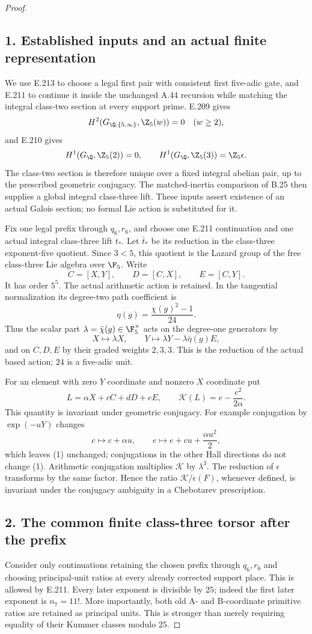 \begin{proof}
\subsection*{1. Established inputs and an actual finite representation}
We use E.213 to choose a legal first pair with consistent first five-adic gate, and E.211 to continue it inside the unchanged A.44 recursion while matching the integral class-two section at every support prime. E.209 gives
\[
 H^2(G_{\Q,\{5,\infty\}},\Z_5(w))=0\quad(w\ge2),
\]
and E.210 gives
\[
 H^1(G_\Q,\Z_5(2))=0,\qquad
 H^1(G_\Q,\Z_5(3))=\Z_5\epsilon.
\]
The class-two section is therefore unique over a fixed integral abelian pair, up to the prescribed geometric conjugacy. The matched-inertia comparison of B.25 then supplies a global integral class-three lift. These inputs assert existence of an actual Galois section; no formal Lie action is substituted for it.

Fix one legal prefix through $q_6,r_6$, and choose one E.211 continuation and one actual integral class-three lift $t_*$. Let $\bar t_*$ be its reduction in the class-three exponent-five quotient. Since $3<5$, this quotient is the Lazard group of the free class-three Lie algebra over $\F_5$. Write
\[
 C=[X,Y],\qquad D=[C,X],\qquad E=[C,Y].
\]
It has order $5^5$. The actual arithmetic action is retained. In the tangential normalization its degree-two path coefficient is
\[
 \eta(g)=\frac{\chi(g)^2-1}{24}.
\]
Thus the scalar part $\lambda=\bar\chi(g)\in\F_5^\times$ acts on the degree-one generators by
\[
 X\longmapsto\lambda X,\qquad
 Y\longmapsto\lambda Y-\lambda\bar\eta(g)E,
\]
and on $C,D,E$ by their graded weights $2,3,3$. This is the reduction of the actual based action; $24$ is a five-adic unit.

For an element with zero $Y$ coordinate and nonzero $X$ coordinate put
\[
 L=\alpha X+cC+dD+eE,\qquad
 \mathcal K(L)=e-\frac{c^2}{2\alpha}.
 \tag{1}
\]
This quantity is invariant under geometric conjugacy. For example conjugation by $\exp(-uY)$ changes
\[
 c\mapsto c+\alpha u,\qquad
 e\mapsto e+cu+\frac{\alpha u^2}{2},
\]
which leaves (1) unchanged; conjugations in the other Hall directions do not change (1). Arithmetic conjugation multiplies $\mathcal K$ by $\lambda^3$. The reduction of $\epsilon$ transforms by the same factor. Hence the ratio $\mathcal K/\epsilon(F)$, whenever defined, is invariant under the conjugacy ambiguity in a Chebotarev prescription.

\subsection*{2. The common finite class-three torsor after the prefix}
Consider only continuations retaining the chosen prefix through $q_6,r_6$ and choosing principal-unit ratios at every already corrected support place. This is allowed by E.211. Every later exponent is divisible by $25$; indeed the first later exponent is $n_7=11!$. More importantly, both old A- and B-coordinate primitive ratios are retained as principal units. This is stronger than merely requiring equality of their Kummer classes modulo $25$.


\end{proof}
